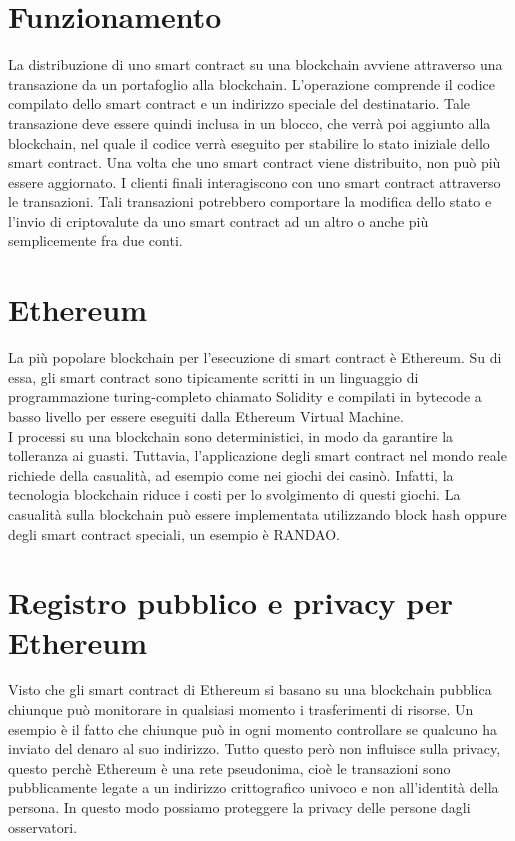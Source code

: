 \documentclass[a4paper,11pt]{report}
\begin{document}
\section{Funzionamento}
La distribuzione di uno smart contract su una blockchain avviene attraverso una transazione da un portafoglio alla blockchain. L'operazione comprende il codice compilato dello smart contract e un indirizzo speciale del destinatario. Tale transazione deve essere quindi inclusa in un blocco, che verrà poi aggiunto alla blockchain, nel quale il codice verrà eseguito per stabilire lo stato iniziale dello smart contract. Una volta che uno smart contract viene distribuito, non può più essere aggiornato. I clienti finali interagiscono con uno smart contract attraverso le transazioni. Tali transazioni potrebbero comportare la modifica dello stato e l'invio di criptovalute da uno smart contract ad un altro o anche più semplicemente fra due conti.

\section{Ethereum}
La più popolare blockchain per l'esecuzione di smart contract è Ethereum. Su di essa, gli smart contract sono tipicamente scritti in un linguaggio di programmazione turing-completo chiamato Solidity e compilati in bytecode a basso livello per essere eseguiti dalla Ethereum Virtual Machine.\\
I processi su una blockchain sono deterministici, in modo da garantire la tolleranza ai guasti. Tuttavia, l'applicazione degli smart contract nel mondo reale richiede della casualità, ad esempio come nei giochi dei casinò. Infatti, la tecnologia blockchain riduce i costi per lo svolgimento di questi giochi. La casualità sulla blockchain può essere implementata utilizzando block hash oppure degli smart contract speciali, un esempio è RANDAO.

\section{Registro pubblico e privacy per Ethereum}
Visto che gli smart contract di Ethereum si basano su una blockchain pubblica chiunque può monitorare in qualsiasi momento i trasferimenti di risorse. Un esempio è il fatto che chiunque può in ogni momento controllare se qualcuno ha inviato del denaro al suo indirizzo. Tutto questo però non influisce sulla privacy, questo perchè Ethereum è una rete pseudonima, cioè le transazioni sono pubblicamente legate a un indirizzo crittografico univoco e non all'identità della persona. In questo modo possiamo proteggere la privacy delle persone dagli osservatori.
\end{document}
